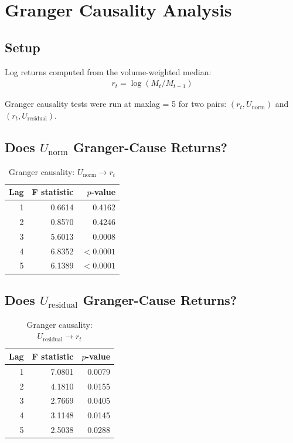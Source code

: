 \documentclass[11pt]{article}
\begin{document}
\section{Granger Causality Analysis}

\subsection{Setup}

Log returns computed from the volume-weighted median:
\begin{align}
    r_t = \log(M_t / M_{t-1})
\end{align}

Granger causality tests were run at maxlag = 5 for two pairs: $(r_t, U_\mathrm{norm})$ and $(r_t, U_\mathrm{residual})$.

\subsection{Does \texorpdfstring{$U_\mathrm{norm}$}{U\_norm} Granger-Cause Returns?}

\begin{table}[htbp]
\centering
\caption{Granger causality: $U_\mathrm{norm} \to r_t$}
\begin{tabular}{rrr}
\toprule
Lag & F statistic & $p$-value \\
\midrule
1 & 0.6614 & 0.4162 \\
2 & 0.8570 & 0.4246 \\
3 & 5.6013 & 0.0008 \\
4 & 6.8352 & $<0.0001$ \\
5 & 6.1389 & $<0.0001$ \\
\bottomrule
\end{tabular}
\end{table}

\subsection{Does \texorpdfstring{$U_\mathrm{residual}$}{U\_residual} Granger-Cause Returns?}

\begin{table}[htbp]
\centering
\caption{Granger causality: $U_\mathrm{residual} \to r_t$}
\begin{tabular}{rrr}
\toprule
Lag & F statistic & $p$-value \\
\midrule
1 & 7.0801 & 0.0079 \\
2 & 4.1810 & 0.0155 \\
3 & 2.7669 & 0.0405 \\
4 & 3.1148 & 0.0145 \\
5 & 2.5038 & 0.0288 \\
\bottomrule
\end{tabular}
\end{table}
\end{document}
